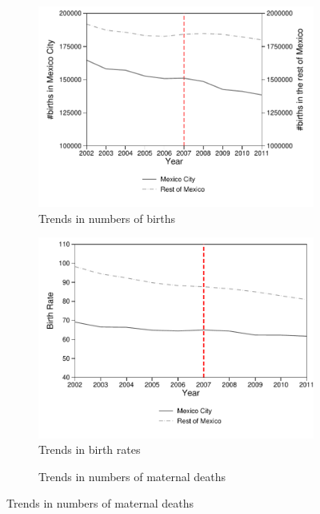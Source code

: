 \documentclass[a4paper, 11pt]{article}
\begin{document}
\begin{spacing}{2}
\begin{figure}[H]
\centering	\caption{Trends in Reform and non-Reform Areas}
\label{Trends}
\begin{subfigure}{.5\textwidth}
\centering	\caption{Trends in numbers of births}\label{birthTrends}
\includegraphics[scale=0.55]{figures/TrendBirth.pdf}
\end{subfigure}%
\begin{subfigure}{.5\textwidth}
\centering\caption{Trends in birth rates}\label{birthrateTrends}
\includegraphics[scale=0.55]{figures/TrendBirthRates.pdf}
\end{subfigure}
\begin{subfigure}{.5\textwidth}
\centering	\caption{Trends in numbers of maternal deaths}	\label{deathsTrends}

\end{subfigure}
\end{figure}
\end{spacing}
\end{document}
